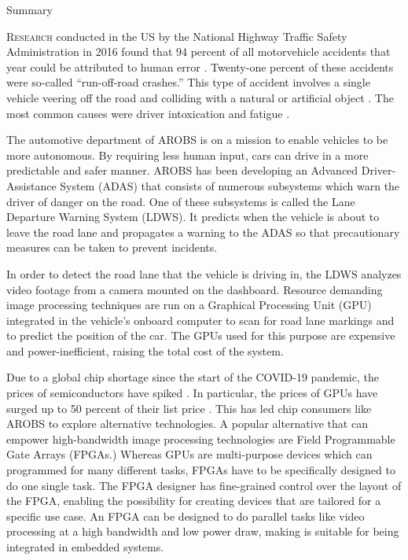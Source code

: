 \documentclass{matthijs}
\begin{document}

	\thispagestyle{empty}
	

	\begin{hoofdstuk*}{Summary}

		\setlength\parindent{1.5em}
		\setlength{\parskip}{0.5em plus 0.2em minus 0.1em}
		\linespread{1.2}
		
		\lettrine[findent=0.3em, nindent=0.0em, lraise=0.03]{R}{esearch} conducted in the US by the National Highway Traffic Safety Administration in 2016 found that 94 percent of all motorvehicle accidents that year could be attributed to human error \cite{nhtsa2017fatal}.
		Twenty-one percent of these accidents were so-called ``run-off-road crashes.''
		This type of accident involves a single vehicle veering off the road and colliding with a natural or artificial object \cite{liu2009factors}.
		The most common causes were driver intoxication and fatigue \cite{nhtsa2017fatal}.

		The automotive department of AROBS is on a mission to enable vehicles to be more autonomous.
		By requiring less human input, cars can drive in a more predictable and safer manner.
		AROBS has been developing an Advanced Driver-Assistance System (ADAS) that consists of numerous subsystems which warn the driver of danger on the road.
		One of these subsystems is called the Lane Departure Warning System (LDWS).
		It predicts when the vehicle is about to leave the road lane and propagates a warning to the ADAS so that precautionary measures can be taken to prevent incidents.

		In order to detect the road lane that the vehicle is driving in, the LDWS analyzes video footage from a camera mounted on the dashboard.
		Resource demanding image processing techniques are run on a Graphical Processing Unit (GPU) integrated in the vehicle's onboard computer to scan for road lane markings and to predict the position of the car.
		The GPUs used for this purpose are expensive and power-inefficient, raising the total cost of the system.

		Due to a global chip shortage since the start of the COVID-19 pandemic, the prices of semiconductors have spiked \cite{ivanova2021chip}.
		In particular, the prices of GPUs have surged up to 50 percent of their list price \cite{cheng2021chip}.
		This has led chip consumers like AROBS to explore alternative technologies.
		A popular alternative that can empower high-bandwidth image processing technologies are Field Programmable Gate Arrays (FPGAs.)
		Whereas GPUs are multi-purpose devices which can programmed for many different tasks, FPGAs have to be specifically designed to do one single task.
		The FPGA designer has fine-grained control over the layout of the FPGA, enabling the possibility for creating devices that are tailored for a specific use case.
		An FPGA can be designed to do parallel tasks like video processing at a high bandwidth and low power draw, making is suitable for being integrated in embedded systems.


\end{hoofdstuk*}
\end{document}
